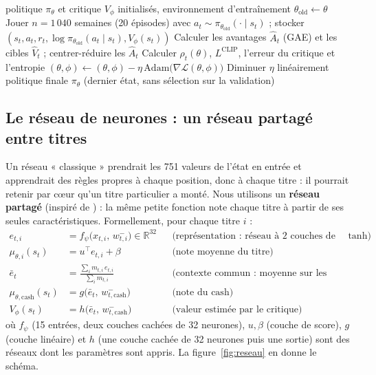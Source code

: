 \documentclass[11pt,a4paper]{article}
\newcommand{\R}{\mathbb{R}}
\begin{document}
\begin{algorithm}[H]
\caption{Entraînement PPO (implémentation stable-baselines3)}
\begin{algorithmic}[1]
\Require politique \(\pi_\theta\) et critique \(V_\phi\) initialisés, environnement d'entraînement
  \State \(\theta_{\text{old}}\gets\theta\)
  \State Jouer \(n=1\,040\) semaines (20 épisodes) avec \(a_t\sim\pi_{\theta_{\text{old}}}(\cdot\mid s_t)\) ;
         stocker \((s_t,a_t,r_t,\log\pi_{\theta_{\text{old}}}(a_t\mid s_t),V_\phi(s_t))\)
  \State Calculer les avantages \(\hat A_t\) (GAE) et les cibles \(\hat V_t\) ; centrer-réduire les \(\hat A_t\)
      \State Calculer \(\rho_t(\theta)\), \(L^{\text{CLIP}}\), l'erreur du critique et l'entropie
      \State \((\theta,\phi)\gets(\theta,\phi)-\eta\,\mathrm{Adam}\big(\nabla\mathcal L(\theta,\phi)\big)\)
    \EndFor
  \EndFor
  \State Diminuer \(\eta\) linéairement
\EndFor
\Ensure politique finale \(\pi_\theta\) (dernier état, sans sélection sur la validation)
\end{algorithmic}
\end{algorithm}

\subsection{Le réseau de neurones : un réseau partagé entre titres}\label{sec:reseau}
Un réseau « classique » prendrait les 751 valeurs de l'état en entrée et apprendrait des règles propres à chaque
position, donc à chaque titre : il pourrait retenir par cœur qu'un titre particulier a monté. Nous utilisons un
\textbf{réseau partagé} (inspiré de \cite{jiang2017}) : la même petite fonction note chaque titre à partir de ses
seules caractéristiques. Formellement, pour chaque titre \(i\) :
\begin{align}
  e_{t,i} &= f_\psi\big(x_{t,i},\,w^{-}_{t,i}\big)\in\R^{32}
  &&\text{(représentation : réseau à 2 couches de 32 neurones, activation } \tanh\text{)}\\
  \mu_{\theta,i}(s_t) &= u^\top e_{t,i}+\beta
  &&\text{(note moyenne du titre)}\\
  \bar e_t &= \frac{\sum_i m_{t,i}\,e_{t,i}}{\sum_i m_{t,i}}
  &&\text{(contexte commun : moyenne sur les titres disponibles)}\\
  \mu_{\theta,\text{cash}}(s_t) &= g\big(\bar e_t,\,w^{-}_{t,\text{cash}}\big)
  &&\text{(note du cash)}\\
  V_\phi(s_t) &= h\big(\bar e_t,\,w^{-}_{t,\text{cash}}\big)
  &&\text{(valeur estimée par le critique)}
\end{align}
où \(f_\psi\) (15 entrées, deux couches cachées de 32 neurones), \(u,\beta\) (couche de score), \(g\) (couche
linéaire) et \(h\) (une couche cachée de 32 neurones puis une sortie) sont des réseaux dont les paramètres sont
appris. La figure~\ref{fig:reseau} en donne le schéma.
\end{document}
